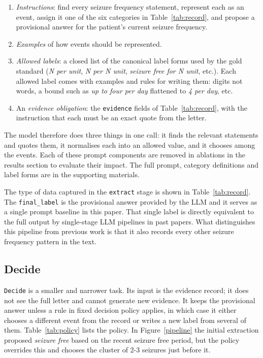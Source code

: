 \documentclass[conference]{IEEEtran}
\begin{document}
\begin{enumerate}
\item \emph{Instructions}: find every seizure frequency 
statement, represent each as an event, assign it one of the 
six categories in Table~\ref{tab:record}, and propose a 
provisional answer for the patient's current seizure 
frequency.
\item \emph{Examples} of how events should be represented.
\item \emph{Allowed labels}: a closed list of the canonical 
label forms used by the gold standard (\emph{N per unit}, 
\emph{N per N unit}, \emph{seizure free for N unit}, etc.).
Each allowed label comes with examples and rules for writing them: digits not 
words, a bound such as \emph{up to four per day} flattened to 
\emph{4 per day}, etc.
\item An \emph{evidence obligation}: the \texttt{evidence} 
fields of Table~\ref{tab:record}, with the instruction that 
each must be an exact quote from the letter.
\end{enumerate}

The model therefore does three things in one call: it finds 
the relevant statements and quotes them, it normalises each 
into an allowed value, and it chooses among the events. 
Each of these prompt components are removed in ablations 
in the results section to evaluate their impact. The full prompt, 
category definitions and label forms are in the supporting 
materials.

The type of data captured in the \texttt{extract} stage is
shown in Table~\ref{tab:record}. The  \texttt{final\_label}
is the provisional answer provided by the LLM and it 
serves as a single prompt baseline in this paper. That
single label is directly equivalent to the full output 
by single-stage LLM pipelines in past papers\cite{b3}.
What distinguishes this pipeline from previous work is 
that it also records every other seizure frequency pattern 
in the text.

\subsection{Decide}
\label{sec:decide}

\texttt{Decide} is a smaller and narrower task. Its input is 
the evidence record; it does not see the full letter and cannot 
generate new evidence. It keeps the provisional answer unless a 
rule in fixed decision policy applies, in which case it 
either chooses a different event from the record or writes a 
new label from several of them. Table~\ref{tab:policy} lists 
the policy. In Figure~\ref{pipeline} the initial extraction proposed 
\emph{seizure free} based on the recent seizure free period, but the 
policy overrides this and chooses the cluster of 2-3 seizures just 
before it. 
\end{document}
